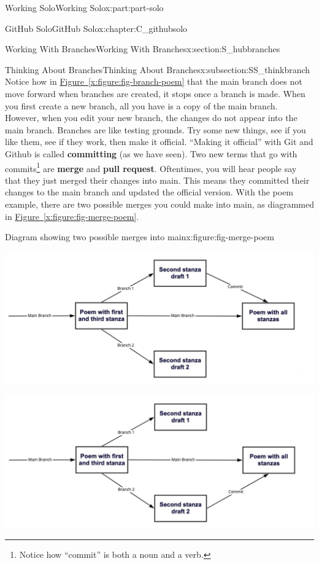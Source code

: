 \documentclass[oneside,10pt,]{book}
\newcommand{\xreffont}{\relax}
\newcommand{\terminology}[1]{\textbf{#1}}
\begin{document}
\begin{partptx}{Working Solo}{}{Working Solo}{}{}{x:part:part-solo}
\begin{chapterptx}{GitHub Solo}{}{GitHub Solo}{}{}{x:chapter:C_githubsolo}
\begin{sectionptx}{Working With Branches}{}{Working With Branches}{}{}{x:section:S_hubbranches}
\begin{subsectionptx}{Thinking About Branches}{}{Thinking About Branches}{}{}{x:subsection:SS_thinkbranch}
 Notice how in \hyperref[x:figure:fig-branch-poem]{Figure~{\xreffont\ref{x:figure:fig-branch-poem}}} that the main branch does not move forward when branches are created, it stops once a branch is made. When you first create a new branch, all you have is a copy of the main branch. However, when you edit your new branch, the changes do not appear into the main branch. Branches are like testing grounds. Try some new things, see if you like them, see if they work, then make it official. ``Making it official'' with Git and Github is called \terminology{committing} (as we have seen). Two new terms that go with commits\footnote{Notice how ``commit'' is both a noun and a verb.\label{g:fn:idm480205016}} are \terminology{merge} and \terminology{pull request}. Oftentimes, you will hear people say that they just merged their changes into main. This means they committed their changes to the main branch and updated the official version. With the poem example, there are two possible merges you could make into main, as diagrammed in \hyperref[x:figure:fig-merge-poem]{Figure~{\xreffont\ref{x:figure:fig-merge-poem}}}.%
\begin{figureptx}{Diagram showing two possible merges into main}{x:figure:fig-merge-poem}{}%
\begin{image}{0.05}{0.9}{0.05}%
\includegraphics[width=\linewidth]{external/merge_poem1.pdf}
\end{image}%
\begin{image}{0.05}{0.9}{0.05}%
\includegraphics[width=\linewidth]{external/merge_poem2.pdf}

\end{image}
\end{figureptx}
\end{subsectionptx}
\end{sectionptx}
\end{chapterptx}
\end{partptx}
\end{document}
